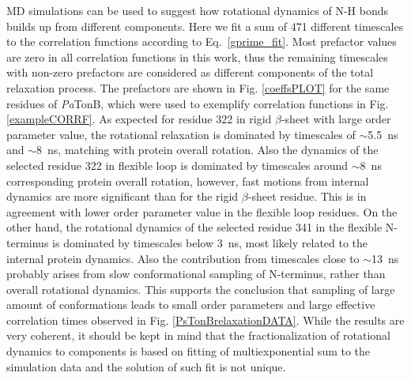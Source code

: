 \documentclass[pre,aps,floatfix,authordate1-4,twocolumn]{revtex4-1}
\begin{document}
MD simulations can be used to suggest how rotational dynamics of N-H bonds
builds up from different components. Here we fit a sum of 471 different
timescales to the correlation functions according to Eq.~\ref{gprime_fit}.
Most prefactor values are zero in all correlation functions in this work,
thus the remaining timescales with non-zero prefactors are considered as different
components of the total relaxation process.
The prefactors are shown in Fig. \ref{coeffsPLOT} for the same residues
of {\it Pa}TonB, which were used to exemplify correlation functions in Fig. \ref{exampleCORRF}.
As expected for residue 322 in rigid $\beta$-sheet with large order parameter value,
the rotational relaxation is dominated by timescales of $\sim$5.5~ns and $\sim$8~ns,
matching with protein overall
rotation. Also the dynamics of the selected residue 322 in flexible loop is
dominated by timescales around $\sim$8~ns corresponding protein overall rotation,
however, fast motions from internal dynamics are more significant than for the
rigid $\beta$-sheet residue. This is in agreement with lower order parameter value
in the flexible loop residues. On the other hand, the rotational dynamics of
the selected residue 341 in the flexible N-terminus is dominated by timescales
below 3~ns, most likely related to the internal protein dynamics.
Also the contribution from timescales close to $\sim$13~ns probably
arises from slow conformational sampling of N-terminus, rather than overall
rotational dynamics. This supports the conclusion that sampling of large amount of
conformations leads to small order parameters and large effective correlation times
observed in Fig. \ref{PsTonBrelaxationDATA}.
While the results are very coherent, it should be kept in mind that
the fractionalization of rotational dynamics to components is based on
fitting of multiexponential sum to the simulation data and the solution
of such fit is not unique.
\end{document}
